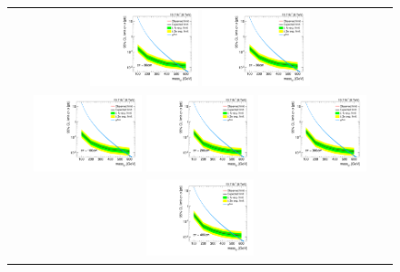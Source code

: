 \begin{figure}[!h]
\begin{tabular}{c}
    \includegraphics[width=0.29\textwidth]{figures/analysis/Interpretation/ExclusionLimits/LimitPlot_ctau80cm.pdf} 
    \includegraphics[width=0.29\textwidth]{figures/analysis/Interpretation/ExclusionLimits/LimitPlot_ctau90cm.pdf} \\
    \includegraphics[width=0.29\textwidth]{figures/analysis/Interpretation/ExclusionLimits/LimitPlot_ctau100cm.pdf} 
    \includegraphics[width=0.29\textwidth]{figures/analysis/Interpretation/ExclusionLimits/LimitPlot_ctau200cm.pdf} 
    \includegraphics[width=0.29\textwidth]{figures/analysis/Interpretation/ExclusionLimits/LimitPlot_ctau300cm.pdf} \\
    \includegraphics[width=0.29\textwidth]{figures/analysis/Interpretation/ExclusionLimits/LimitPlot_ctau400cm.pdf} 

\end{tabular}
\end{figure}
